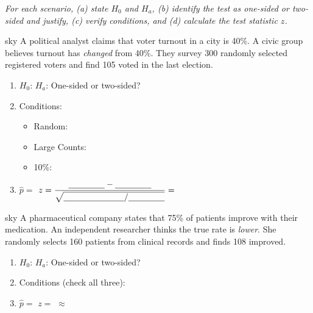 \documentclass[10pt]{article}
\begin{document}
\namepartnerperiod

\vspace{0.15in}

\textit{For each scenario, (a) state $H_0$ and $H_a$, (b) identify the test as one-sided or
two-sided and justify, (c) verify conditions, and (d) calculate the test statistic $z$.}

\begin{scenariobox}{sky}
A political analyst claims that voter turnout in a city is 40\%. A civic group believes
turnout has \emph{changed} from 40\%. They survey 300 randomly selected registered voters
and find 105 voted in the last election.

\begin{enumerate}[label=\alph*.]
  \item $H_0$: \blank{4cm} \quad $H_a$: \blank{4cm} \quad One-sided or two-sided? \blank{3cm}
  \item Conditions:
        \begin{itemize}
          \item Random: \blank{5cm}
          \item Large Counts: \blank{7cm}
          \item 10\%: \blank{5cm}
        \end{itemize}
  \item $\hat p = $ \blank{2cm} \quad $z = \dfrac{\blank{1.5cm} - \blank{1.5cm}}{\sqrt{\blank{2.5cm}/\blank{1.5cm}}} = $ \blank{2cm}
\end{enumerate}
\end{scenariobox}

\begin{scenariobox}{sky}
A pharmaceutical company states that 75\% of patients improve with their medication. An
independent researcher thinks the true rate is \emph{lower}. She randomly selects 160
patients from clinical records and finds 108 improved.

\begin{enumerate}[label=\alph*.]
  \item $H_0$: \blank{4cm} \quad $H_a$: \blank{4cm} \quad One-sided or two-sided? \blank{3cm}
  \item Conditions (check all three): 
  \item $\hat p = $ \blank{2cm} \quad $z = $ \blank{4cm} $\approx$ \blank{2cm}
\end{enumerate}
\end{scenariobox}
\end{document}

